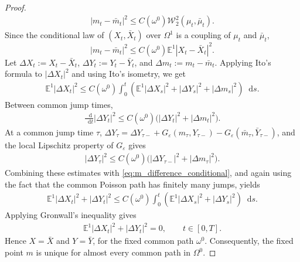 \documentclass{article}
\newcommand*\der{\mathop{}\!\mathrm{d}}
\numberwithin{equation}{section}
\begin{document}
\begin{proof}
\begin{align*}
    |m_t-\bar m_t|^2
    \leq
    C(\omega^0)
    \mathcal W_2^2(\mu_t,\bar\mu_t).
\end{align*}
Since the conditional law of $(X_t,\bar X_t)$ over $\Omega^1$ is a coupling of $\mu_t$ and $\bar\mu_t$,
\begin{equation}
    |m_t-\bar m_t|^2
    \le
   C(\omega^0)
    \mathbb E^1|X_t-\bar X_t|^2.
    \label{eq:m_difference_conditional}
\end{equation}
Let $\Delta X_t:=X_t-\bar X_t$, $\Delta Y_t:=Y_t-\bar Y_t$, and $\Delta m_t:=m_t-\bar m_t$.
Applying Ito's formula to $|\Delta X_t|^2$ and using Ito's isometry, we get
\begin{align}
    \mathbb E^1|\Delta X_t|^2
    \leq
    C(\omega^0)
    \int_0^t
    \left(
        \mathbb E^1|\Delta X_s|^2
        +
        |\Delta Y_s|^2
        +
        |\Delta m_s|^2
    \right)\der s.
\end{align}
Between common jump times,
\begin{align*}
    \frac{\der }{\der t}|\Delta Y_t|^2
    \leq
    C(\omega^0)
    \bigl(
        |\Delta Y_t|^2+|\Delta m_t|^2
    \bigr).
\end{align*}
At a common jump time $\tau$, $\Delta Y_\tau
    =\Delta Y_{\tau-} + G_\varepsilon(m_{\tau},Y_{\tau-})
    - G_\varepsilon(\bar m_{\tau},\bar Y_{\tau-})$,
and the local Lipschitz property of $G_\varepsilon$ gives
\begin{align*}
    |\Delta Y_\tau|^2
    \le
    C(\omega^0)
    \bigl(
        |\Delta Y_{\tau-}|^2+|\Delta m_{\tau}|^2
    \bigr).
\end{align*}
Combining these estimates with \eqref{eq:m_difference_conditional}, and again using the fact that the common Poisson path has finitely many jumps, yields
\begin{align}
    \mathbb E^1|\Delta X_t|^2+|\Delta Y_t|^2
    \leq
    C(\omega^0)
    \int_0^t
    \left(\mathbb E^1|\Delta X_s|^2+|\Delta Y_s|^2
    \right)\der s.
\end{align}
Applying Gronwall's inequality gives
\begin{align}
    \mathbb E^1|\Delta X_t|^2+|\Delta Y_t|^2=0,
    \qquad
    t\in[0,T].
\end{align}
Hence $X=\bar X$ and $Y=\bar Y$, for the fixed common path $\omega^0$. Consequently, the fixed point $m$ is unique for almost every common path in $\Omega^0$.


\end{proof}
\end{document}
